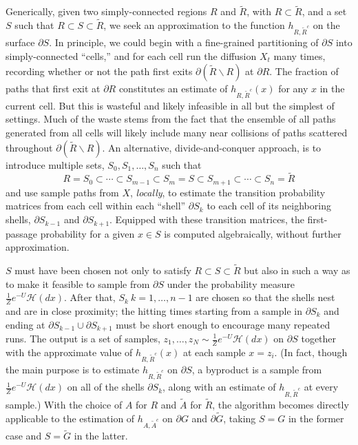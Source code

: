 \documentclass[nofootinbib,english, aip, jcp, priprint, graphicx,floatfix]{revtex4-1}
\theoremstyle{plain}
\theoremstyle{definition}
\theoremstyle{plain}
\newcommand{\hausdorffmeasure}{\mathscr{H}(dx)}
\begin{document}
Generically, given two simply-connected regions $R$ and $\tilde{R}$, with $R\subset \tilde{R}$, and a set $S$ such that 
$R\subset S  \subset\tilde{R}$, we seek an approximation to 
the function $h_{R,\tilde{R}^c}$ on the surface $\partial S$. In principle, we could begin with a fine-grained partitioning of $\partial S$ into simply-connected ``cells,'' and for each cell run the diffusion $X_t$ many times, recording whether or not the path first exits $\partial (\tilde{R}\backslash R)$ at $\partial R$. The fraction of paths that first exit at $\partial R$ constitutes an estimate of 
$h_{R,\tilde{R}^c}(x)$ for any $x$ in the current cell. But this is wasteful and likely infeasible in all but the simplest of settings. Much of the waste stems from the fact that the ensemble of all paths generated from all cells will likely include many near collisions of paths scattered throughout $\partial (\tilde{R}\backslash R)$. An alternative, divide-and-conquer  approach, is to introduce multiple sets, $S_0,S_1,\ldots,S_n$ such that 
\begin{equation*}
R=S_0 \subset \cdots \subset S_{m-1}\subset S_m = S \subset S_{m+1} \subset \cdots \subset S_n = \tilde{R}
\end{equation*}
and use sample paths from $X$, {\em locally}, to estimate the transition probability matrices from each cell within each ``shell'' $\partial S_k$ to each cell of its neighboring shells, $\partial S_{k-1}$ and $\partial S_{k+1}$. Equipped with these transition matrices, the first-passage probability for a given $x\in S$ is computed algebraically, without further approximation.  

$S$ must have been chosen not only to satisfy $R\subset S  \subset\tilde{R}$ but also in such a way as to make it feasible to sample from $\partial S$ under the probability measure
$\frac{1}{Z}e^{-U}\hausdorffmeasure$. After that, $S_k\ k=1,\ldots,n-1$ are chosen so that the shells nest and are in close proximity; the hitting times starting from a sample in $\partial
 S_k$ and ending at $\partial S_{k-1} \cup \partial S_{k+1}$ must be short enough to encourage many repeated runs. The output is a set of samples, 
 $z_1,\ldots,z_N \sim \frac{1}{Z}e^{-U}\hausdorffmeasure$ on $\partial S$ together with the approximate value of $h_{R,\tilde{R}^c}(x)$ at each sample $x=z_i$. (In fact, though the main purpose is to estimate $h_{R,\tilde{R}^c}$ on 
 $\partial S$, a byproduct is a sample from $\frac{1}{Z}e^{-U}\hausdorffmeasure$ on all of the shells $\partial S_k$, along with an estimate of $h_{R,\tilde{R}^c}$ at every sample.)
With the choice of $A$ for $R$ and $\tilde A$ for $\tilde R$, the algorithm becomes directly applicable to the estimation of $h_{A, \tilde{A}^c}$ on $\partial G$ and $\partial\tilde{G}$, taking $S=G$ in the former case and $S=\tilde{G}$ in the latter.
 
\end{document}
